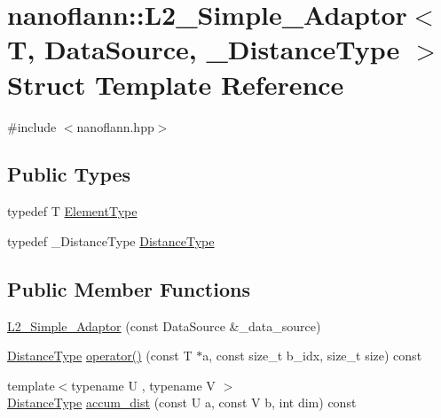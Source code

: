 \hypertarget{structnanoflann_1_1_l2___simple___adaptor}{\section{nanoflann\-:\-:L2\-\_\-\-Simple\-\_\-\-Adaptor$<$ T, Data\-Source, \-\_\-\-Distance\-Type $>$ Struct Template Reference}
\label{structnanoflann_1_1_l2___simple___adaptor}
}


{\ttfamily \#include $<$nanoflann.\-hpp$>$}

\subsection*{Public Types}
\begin{DoxyCompactItemize}
\item 
typedef T \hyperlink{structnanoflann_1_1_l2___simple___adaptor_a882b70b60ea7842866d7863c63363bb5}{Element\-Type}
\item 
typedef \-\_\-\-Distance\-Type \hyperlink{structnanoflann_1_1_l2___simple___adaptor_a40d16c5ee10a87c22bc7a484dd992ed8}{Distance\-Type}
\end{DoxyCompactItemize}
\subsection*{Public Member Functions}
\begin{DoxyCompactItemize}
\item 
\hyperlink{structnanoflann_1_1_l2___simple___adaptor_aca284c8c32d6653f28e822d9a9ce374e}{L2\-\_\-\-Simple\-\_\-\-Adaptor} (const Data\-Source \&\-\_\-data\-\_\-source)
\item 
\hyperlink{structnanoflann_1_1_l2___simple___adaptor_a40d16c5ee10a87c22bc7a484dd992ed8}{Distance\-Type} \hyperlink{structnanoflann_1_1_l2___simple___adaptor_a43bd5f86fb46494d07177401d39392f7}{operator()} (const T $\ast$a, const size\-\_\-t b\-\_\-idx, size\-\_\-t size) const 
\item 
{\footnotesize template$<$typename U , typename V $>$ }\\\hyperlink{structnanoflann_1_1_l2___simple___adaptor_a40d16c5ee10a87c22bc7a484dd992ed8}{Distance\-Type} \hyperlink{structnanoflann_1_1_l2___simple___adaptor_a71bb34fdbcf311e0f71424541bacbb74}{accum\-\_\-dist} (const U a, const V b, int dim) const 
\end{DoxyCompactItemize}
